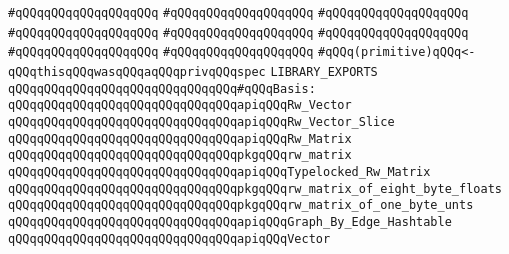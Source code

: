 \verb|#qQQqqQQqqQQqqQQqqQQq|\newline
\verb|#qQQqqQQqqQQqqQQqqQQq|\newline
\verb|#qQQqqQQqqQQqqQQqqQQq|\newline
\newline
\verb|#qQQqqQQqqQQqqQQqqQQq|\newline
\verb|#qQQqqQQqqQQqqQQqqQQq|\newline
\verb|#qQQqqQQqqQQqqQQqqQQq|\newline
\verb|#qQQqqQQqqQQqqQQqqQQq|\newline
\verb|#qQQqqQQqqQQqqQQqqQQq|\newline
\newline
\verb|#qQQq(primitive)qQQq<-qQQqthisqQQqwasqQQqaqQQqprivqQQqspec|\newline
\newline
\verb|LIBRARY_EXPORTS|\newline
\newline
\verb|qQQqqQQqqQQqqQQqqQQqqQQqqQQqqQQq#qQQqBasis:|\newline
\verb|qQQqqQQqqQQqqQQqqQQqqQQqqQQqqQQqapiqQQqRw_Vector|\newline
\verb|qQQqqQQqqQQqqQQqqQQqqQQqqQQqqQQqapiqQQqRw_Vector_Slice|\newline
\newline
\verb|qQQqqQQqqQQqqQQqqQQqqQQqqQQqqQQqapiqQQqRw_Matrix|\newline
\verb|qQQqqQQqqQQqqQQqqQQqqQQqqQQqqQQqpkgqQQqrw_matrix|\newline
\newline
\verb|qQQqqQQqqQQqqQQqqQQqqQQqqQQqqQQqapiqQQqTypelocked_Rw_Matrix|\newline
\verb|qQQqqQQqqQQqqQQqqQQqqQQqqQQqqQQqpkgqQQqrw_matrix_of_eight_byte_floats|\newline
\verb|qQQqqQQqqQQqqQQqqQQqqQQqqQQqqQQqpkgqQQqrw_matrix_of_one_byte_unts|\newline
\newline
\verb|qQQqqQQqqQQqqQQqqQQqqQQqqQQqqQQqapiqQQqGraph_By_Edge_Hashtable|\newline
\verb|qQQqqQQqqQQqqQQqqQQqqQQqqQQqqQQqapiqQQqVector|\newline
